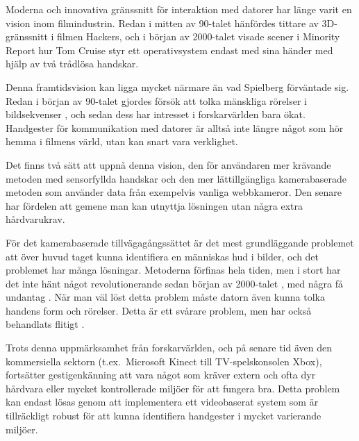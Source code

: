 \documentclass[../rapport_MVEX01-11-05]{subfiles}
\begin{document}
Moderna och innovativa gränssnitt för interaktion med datorer har länge varit
en vision inom filmindustrin. Redan i mitten av 90-talet hänfördes
tittare av 3D-gränssnitt i filmen Hackers, och i början av 2000-talet visade
scener i Minority Report hur Tom Cruise styr ett operativsystem endast med
sina händer med hjälp av två trådlösa handskar.

Denna framtidsvision kan
ligga mycket närmare än vad Spielberg förväntade sig. Redan i början av
90-talet gjordes försök att tolka mänskliga rörelser i bildsekvenser
\cite{Yamato92}, och sedan dess har intresset i forskarvärlden bara ökat.
Handgester för kommunikation med datorer är alltså inte längre något som
hör hemma i filmens värld, utan kan snart vara verklighet.

Det finns två sätt att uppnå denna vision, den för användaren mer krävande
metoden med sensorfyllda handskar och den mer lättillgängliga kamerabaserade
metoden som använder data från exempelvis vanliga webbkameror. Den senare har
fördelen att gemene man kan utnyttja lösningen utan några extra hårdvarukrav.

För det kamerabaserade tillvägagångssättet är det mest grundläggande problemet
att över huvud taget kunna identifiera en människas hud i bilder, och det
problemet har många lösningar. Metoderna förfinas hela tiden, men i stort har
det inte hänt något revolutionerande sedan början av 2000-talet
\cite{Sebe04,Kruppa02,Albiol01,Brand00}, med några få undantag
. När man väl löst detta problem måste datorn
även kunna tolka handens form och rörelser. Detta är ett svårare problem, men
har också behandlats flitigt \cite{Pavlovic97,Garg09,Nielsen04,Zabulis09}.

%

Trots denna uppmärksamhet från forskarvärlden, och på senare tid även den kommersiella sektorn
 (t.ex.~Microsoft Kinect till TV-spelskonsolen Xbox), fortsätter
gestigenkänning att vara något som
kräver extern och ofta dyr hårdvara eller mycket kontrollerade miljöer för att
fungera bra. Detta problem kan endast lösas genom att implementera ett
videobaserat system som är tillräckligt robust för att kunna identifiera
handgester i mycket varierande miljöer.
\end{document}

